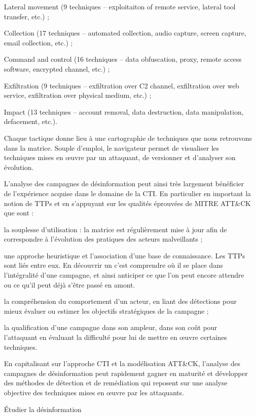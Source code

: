     Lateral movement (9 techniques – exploitaiton of remote service, lateral tool transfer, etc.) ;

    Collection (17 techniques – automated collection, audio capture, screen capture, email collection, etc.) ;

    Command and control (16 techniques – data obfuscation, proxy, remote access software, encrypted channel, etc.) ;

    Exfiltration (9 techniques – exfiltration over C2 channel, exfiltration over web service, exfiltration over physical medium, etc.) ;

    Impact (13 techniques – account removal, data destruction, data manipulation, defacement, etc.).


Chaque tactique donne lieu à une cartographie de techniques que nous retrouvons dans la matrice. Souple d’emploi, le navigateur permet de visualiser les techniques mises en œuvre par un attaquant, de versionner et d’analyser son évolution.

L’analyse des campagnes de désinformation peut ainsi très largement bénéficier de l’expérience acquise dans le domaine de la CTI. En particulier en important la notion de TTPs et en s’appuyant sur les qualités éprouvées de MITRE ATT&CK que sont : 

    la souplesse d’utilisation : la matrice est régulièrement mise à jour afin de correspondre à l’évolution des pratiques des acteurs malveillants ;

    une approche heuristique et l’association d’une base de connaissance. Les TTPs sont liés entre eux. En découvrir un c’est comprendre où il se place dans l’intégralité d’une campagne, et ainsi anticiper ce que l’on peut encore attendre ou ce qu’il peut déjà s’être passé en amont.

    la compréhension du comportement d’un acteur, en liant des détections pour mieux évaluer ou estimer les objectifs stratégiques de la campagne ;

    la qualification d’une campagne dans son ampleur, dans son coût pour l’attaquant en évaluant la difficulté pour lui de mettre en œuvre certaines techniques.

En capitalisant sur l’approche CTI et la modélisation ATT&CK, l’analyse des campagnes de désinformation peut rapidement gagner en maturité et développer des méthodes de détection et de remédiation qui reposent sur une analyse objective des techniques mises en œuvre par les attaquants. 

Étudier la désinformation

